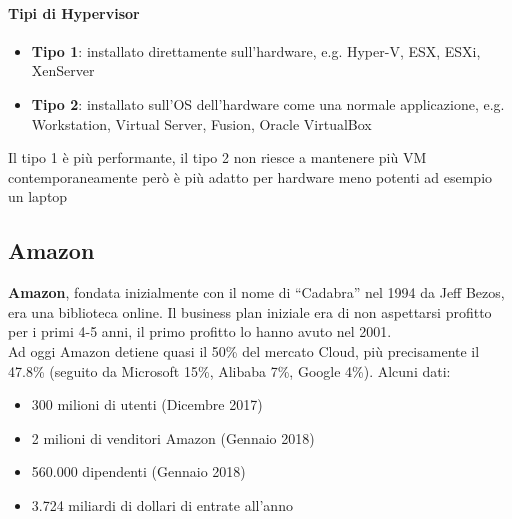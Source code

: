 \paragraph{Tipi di Hypervisor}
\begin{itemize}
    \item \textbf{Tipo 1}: installato direttamente sull’hardware, e.g. Hyper-V, ESX, ESXi, XenServer
    \item \textbf{Tipo 2}: installato sull’OS dell’hardware come una normale applicazione, e.g. Workstation, Virtual Server, Fusion, Oracle VirtualBox
\end{itemize}
Il tipo 1 è più performante, il tipo 2 non riesce a mantenere più VM contemporaneamente però è più adatto per hardware meno potenti ad esempio un laptop

\subsection{Amazon}
\textbf{Amazon}, fondata inizialmente con il nome di “Cadabra” nel 1994 da Jeff Bezos, era una biblioteca online. Il business plan iniziale era di non aspettarsi profitto per i primi 4-5 anni, il primo profitto lo hanno avuto nel 2001.\\
Ad oggi Amazon detiene quasi il 50\% del mercato Cloud, più precisamente il 47.8\% (seguito da Microsoft 15\%, Alibaba 7\%, Google 4\%). Alcuni dati:
\begin{itemize}
    \item 300 milioni di utenti (Dicembre 2017)
    \item 2 milioni di venditori Amazon (Gennaio 2018)
    \item 560.000 dipendenti (Gennaio 2018)
    \item 3.724 miliardi di dollari di entrate all’anno
\end{itemize}


